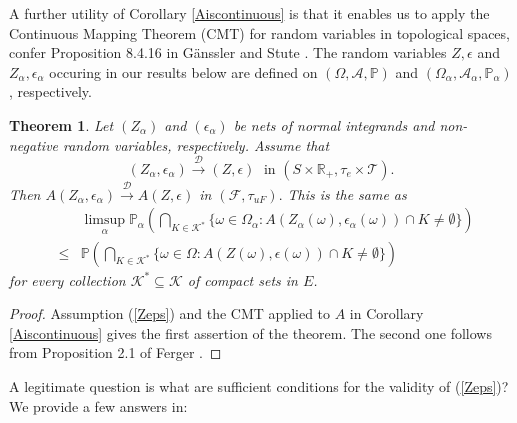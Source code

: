 \documentclass[sn-mathphys,Numbered]{sn-jnl}%
\theoremstyle{thmstyleone}%
\newtheorem{theorem}{Theorem}%
\theoremstyle{thmstyletwo}%
\theoremstyle{thmstylethree}%
\begin{document}
A further utility of Corollary \ref{Aiscontinuous} is that it enables us to apply the Continuous Mapping Theorem (CMT) for random variables in topological spaces, confer Proposition 8.4.16 in G\"{a}nssler and Stute \cite{Stute}.
The random variables $Z, \epsilon$ and $Z_\alpha, \epsilon_\alpha$ occuring in our results below are defined on $(\Omega,\mathcal{A},\mathbb{P})$ and $(\Omega_\alpha,\mathcal{A}_\alpha,\mathbb{P}_\alpha)$, respectively.\\

\begin{theorem} \label{epidistA} Let $(Z_\alpha)$ and $(\epsilon_\alpha)$ be nets of normal integrands and non-negative random variables, respectively.
Assume that
\begin{equation} \label{Zeps}
 (Z_\alpha,\epsilon_\alpha) \stackrel{\mathcal{D}}{\rightarrow} (Z,\epsilon) \; \text{ in } (S \times \mathbb{R}_+,\tau_e \times \mathcal{T}).
\end{equation}
Then $A(Z_\alpha,\epsilon_\alpha) \stackrel{\mathcal{D}}{\rightarrow} A(Z,\epsilon)$ in $(\mathcal{F}, \tau_{uF}).$
This is the same as
\begin{eqnarray} \label{K}
& &\limsup_\alpha \mathbb{P}_\alpha(\bigcap_{K \in \mathcal{K}^*} \{\omega \in \Omega_\alpha: A(Z_\alpha(\omega),\epsilon_\alpha(\omega)) \cap K \neq \emptyset\} ) \nonumber\\
 &\le& \mathbb{P}(\bigcap_{K \in \mathcal{K}^*} \{\omega \in \Omega: A(Z(\omega),\epsilon(\omega)) \cap K \neq \emptyset\} )
\end{eqnarray}
for every collection $\mathcal{K}^* \subseteq \mathcal{K}$ of compact sets in $E$.
\end{theorem}

\begin{proof} Assumption (\ref{Zeps}) and the CMT applied to $A$ in Corollary \ref{Aiscontinuous} gives the first assertion of the theorem. The second one follows from Proposition 2.1 of
Ferger \cite{Ferger2}.
\end{proof}

A legitimate question is what are sufficient conditions for the validity of (\ref{Zeps})? We provide a few answers in:\\
\end{document}

